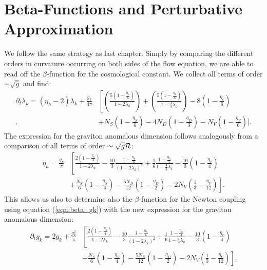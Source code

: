 \section{Beta-Functions and Perturbative Approximation}
We follow the same strategy as last chapter. Simply by comparing the different orders in curvature occurring on both sides of the flow equation, we are able to read off the $\beta$-function for the cosmological constant. We collect all terms of order $\sim \sqrt{\bar{g}}$ and find:
\begin{equation}
\begin{aligned}
	\partial_t\lambda_k = \left(\eta_h - 2\right)\lambda_k + \frac{g_k}{4\pi}&\left[\left(\frac{5\left(1-\frac{\eta_h}{6}\right)}{1-2\lambda_k}\right) + \left(\frac{5\left(1-\frac{\eta_h}{6}\right)}{1-\frac{4}{3}\lambda_k}\right) - 8\left(1-\frac{\eta_c}{6}\right)\right. \\[10pt] 
	\Biggl. &+ N_S\left(1-\frac{\eta_S}{6}\right) - 4N_D\left(1-\frac{\eta_D}{3}\right) - N_V\left(1- \frac{\eta_V}{6}\right)\Biggr].
\end{aligned}
\end{equation}
The expression for the graviton anomalous dimension follows analogously from a comparison of all terms of order $\sim\sqrt{\bar{g}}\bar{\mathcal{R}}$:
\begin{equation}
\begin{aligned}
	\eta_h = \frac{g_k}{\pi}&\left[\frac{2\left(1-\frac{\eta_h}{4}\right)}{1-2\lambda_k} -\frac{10}{3}\frac{1-{\frac{\eta_h}{6}}}{\left(1-2\lambda_k\right)^2}+\frac{1}{6}\frac{1-\frac{\eta_h}{4}}{1-\frac{4}{3}\lambda_k}-\frac{10}{3}\left(1-\frac{\eta_c}{4}\right)\right.\\[10pt]
	 &\left. +\frac{N_S}{6}\left(1-\frac{\eta_S}{4}\right) - \frac{5N_D}{12}\left(1-\frac{\eta_D}{2}\right)-2N_V\left(\frac{1}{3}-\frac{\eta_V}{12}\right)\right].
\end{aligned}
\end{equation}
This allows us also to determine also the $\beta$-function for the Newton coupling using equation (\ref{eqn:beta_gk}) with the new expression for the graviton anomalous dimension:
\begin{equation}
	\begin{aligned}
		\partial_tg_k = 2g_k +\frac{g_k^2}{\pi}&\left[\frac{2\left(1-\frac{\eta_h}{4}\right)}{1-2\lambda_k} -\frac{10}{3}\frac{1-{\frac{\eta_h}{6}}}{\left(1-2\lambda_k\right)^2}+\frac{1}{6}\frac{1-\frac{\eta_h}{4}}{1-\frac{4}{3}\lambda_k}-\frac{10}{3}\left(1-\frac{\eta_c}{4}\right)\right.\\[10pt]
	 &\left. +\frac{N_S}{6}\left(1-\frac{\eta_S}{4}\right) - \frac{5N_D}{12}\left(1-\frac{\eta_D}{2}\right)-2N_V\left(\frac{1}{3}-\frac{\eta_V}{12}\right)\right].
	\end{aligned}
\end{equation}
